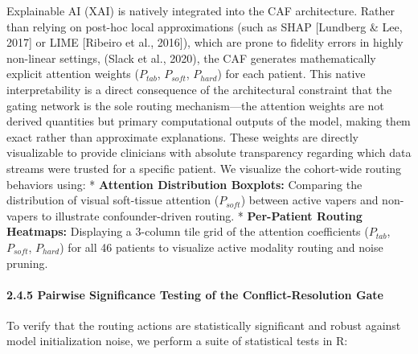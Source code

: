 \documentclass[
]{article}
\begin{document}
Explainable AI (XAI) is natively integrated into the CAF architecture.
Rather than relying on post-hoc local approximations (such as SHAP
{[}Lundberg \& Lee, 2017{]} or LIME {[}Ribeiro et al., 2016{]}), which
are prone to fidelity errors in highly non-linear settings, (Slack et
al., 2020), the CAF generates mathematically explicit attention weights
(\(P_{tab}\), \(P_{soft}\), \(P_{hard}\)) for each patient. This native
interpretability is a direct consequence of the architectural constraint
that the gating network is the sole routing mechanism---the attention
weights are not derived quantities but primary computational outputs of
the model, making them exact rather than approximate explanations. These
weights are directly visualizable to provide clinicians with absolute
transparency regarding which data streams were trusted for a specific
patient. We visualize the cohort-wide routing behaviors using: *
\textbf{Attention Distribution Boxplots:} Comparing the distribution of
visual soft-tissue attention (\(P_{soft}\)) between active vapers and
non-vapers to illustrate confounder-driven routing. *
\textbf{Per-Patient Routing Heatmaps:} Displaying a 3-column tile grid
of the attention coefficients (\(P_{tab}\), \(P_{soft}\), \(P_{hard}\))
for all 46 patients to visualize active modality routing and noise
pruning.

\paragraph{\texorpdfstring{\textbf{2.4.5 Pairwise Significance Testing
of the Conflict-Resolution
Gate}}{2.4.5 Pairwise Significance Testing of the Conflict-Resolution Gate}}\label{pairwise-significance-testing-of-the-conflict-resolution-gate}

To verify that the routing actions are statistically significant and
robust against model initialization noise, we perform a suite of
statistical tests in R:
\end{document}
